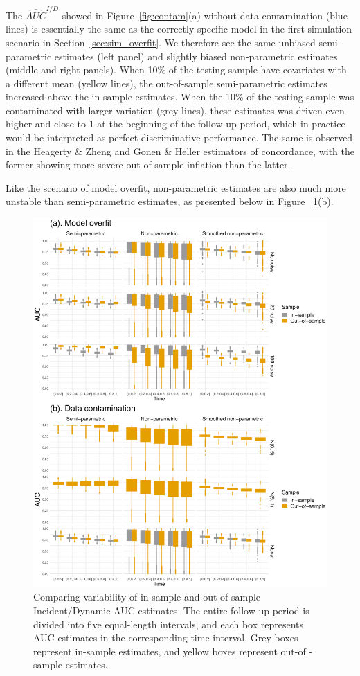 \documentclass[useAMS,usenatbib, referee]{biom}
\begin{document}
The $\hat{AUC}^{I/D}$ showed in Figure~\ref{fig:contam}(a) without data contamination (blue lines) is essentially the same as the correctly-specific model in the first simulation scenario in Section~\ref{sec:sim_overfit}. We therefore see the same unbiased semi-parametric estimates (left panel) and slightly biased non-parametric estimates (middle and right panels). When 10\% of the testing sample have covariates with a different mean (yellow lines), the out-of-sample semi-parametric estimates increased above the in-sample estimates. When the 10\% of the testing sample was contaminated with larger variation (grey lines), these estimates was driven even higher and close to 1 at the beginning of the follow-up period, which in practice would be interpreted as perfect discriminative performance. The same is observed in the Heagerty \& Zheng and Gonen \& Heller estimators of concordance, with the former showing more severe out-of-sample inflation than the latter. 

Like the scenario of model overfit, non-parametric estimates are also much more unstable than semi-parametric estimates, as presented below in Figure ~\ref{fig:auc_box}(b).

\begin{figure}
    \centerline{\includegraphics[width=\textwidth]{auc_box.eps}}
    \caption{Comparing variability of in-sample and out-of-sample Incident/Dynamic AUC estimates. The entire follow-up period is divided into five equal-length intervals, and each box represents AUC estimates in the corresponding time interval. Grey boxes represent in-sample estimates, and yellow boxes represent out-of -sample estimates.}
    \label{fig:auc_box}
\end{figure}
\end{document}
